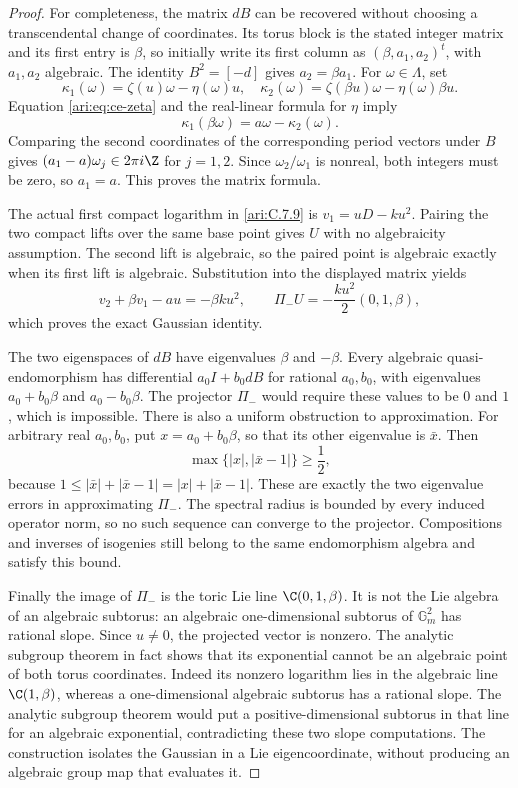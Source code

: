 \begin{proof}
For completeness, the matrix $dB$ can be recovered without
choosing a transcendental change of coordinates. Its torus
block is the stated integer matrix and its first entry is
$\beta$, so initially write its first column as
$(\beta,a_1,a_2)^t$, with $a_1,a_2$ algebraic.
The identity $B^2=[-d]$ gives $a_2=\beta a_1$.
For $\omega\in\Lambda$, set
\[
 \kappa_1(\omega)=\zeta(u)\omega-\eta(\omega)u,
 \quad
 \kappa_2(\omega)=\zeta(\beta u)\omega-\eta(\omega)\beta u.
\]
Equation \eqref{ari:eq:ce-zeta} and the real-linear formula for
$\eta$ imply
\[
 \kappa_1(\beta\omega)=a\omega-\kappa_2(\omega).
\]
Comparing the second coordinates of the corresponding period
vectors under $B$ gives
$(a_1-a)\omega_j\in2\pi i\Z$ for $j=1,2$.
Since $\omega_2/\omega_1$ is nonreal, both integers must
be zero, so $a_1=a$. This proves the matrix formula.

The actual first compact logarithm in \ref{ari:C.7.9} is
$v_1=uD-ku^2$. Pairing the two compact lifts over the same base
point gives $U$ with no algebraicity assumption. The second lift
is algebraic, so the paired point is algebraic exactly when its
first lift is algebraic.
Substitution into the displayed matrix yields
\[
 v_2+\beta v_1-au=-\beta ku^2,
 \qquad
 \Pi_-U=-\frac{ku^2}{2}(0,1,\beta),
\]
which proves the exact Gaussian identity.

The two eigenspaces of $dB$ have eigenvalues $\beta$ and
$-\beta$. Every algebraic quasi-endomorphism has differential
$a_0I+b_0dB$ for rational $a_0,b_0$, with eigenvalues
$a_0+b_0\beta$ and $a_0-b_0\beta$. The projector
$\Pi_-$ would require these values to be $0$ and $1$,
which is impossible. There is also a uniform obstruction to
approximation. For arbitrary real $a_0,b_0$, put
$x=a_0+b_0\beta$, so that its other eigenvalue is
$\bar x$. Then
\begin{equation}\label{ari:eq:ce-gap}
 \max\{|x|,|\bar x-1|\}\ge\frac12,
\end{equation}
because $1\le|\bar x|+|\bar x-1|=|x|+|\bar x-1|$.
These are exactly the two eigenvalue errors in approximating
$\Pi_-$. The spectral radius is bounded by every induced
operator norm, so no such sequence can converge to the
projector. Compositions and inverses of isogenies still belong
to the same endomorphism algebra and satisfy this bound.

Finally the image of $\Pi_-$ is the toric Lie line
$\C(0,1,\beta)$. It is not the Lie algebra of an algebraic
subtorus: an algebraic one-dimensional subtorus of
$\mathbb G_m^2$ has rational slope. Since $u\ne0$,
the projected vector is nonzero. The analytic subgroup
theorem in fact shows that its exponential cannot be an
algebraic point of both torus coordinates. Indeed its nonzero logarithm lies in the algebraic line
$\C(1,\beta)$, whereas a one-dimensional algebraic subtorus
has a rational slope. The analytic subgroup theorem would put
a positive-dimensional subtorus in that line for an algebraic
exponential, contradicting these two slope computations. The construction isolates the Gaussian in
a Lie eigencoordinate, without producing an algebraic
group map that evaluates it.



\end{proof}
